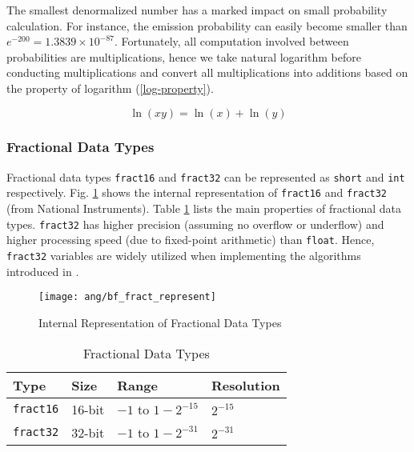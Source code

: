 The smallest denormalized number has a marked impact on small probability calculation. For instance, the emission probability can easily become smaller than $e^{-200} = 1.3839 \times 10^{-87}$. Fortunately, all computation involved between probabilities are multiplications, hence we take natural logarithm before conducting multiplications and convert all multiplications into additions based on the property of logarithm (\ref{log-property}).

\begin{equation}
\label{log-property}
\ln(xy) = \ln(x) + \ln(y)
\end{equation}


\subsubsection{Fractional Data Types}

Fractional data types \texttt{fract16} and \texttt{fract32} can be represented as \texttt{short} and \texttt{int} respectively. Fig. \ref{bf_fract_represent} shows the internal representation of \texttt{fract16} and \texttt{fract32} (from National Instruments). Table \ref{fractional-data-types} lists the main properties of fractional data types. \texttt{fract32} has higher precision (assuming no overflow or underflow) and higher processing speed (due to fixed-point arithmetic) than \texttt{float}. Hence, \texttt{fract32} variables are widely utilized when implementing the algorithms introduced in .

\begin{figure}[H]
\centering
\texttt{[image: ang/bf\_fract\_represent]}
\caption{Internal Representation of Fractional Data Types}
\label{bf_fract_represent}
\end{figure}

\begin{table}[H]
\centering
\caption{Fractional Data Types}
\label{fractional-data-types}
\begin{tabu} to \textwidth {XXXX}
\toprule
Type &Size &Range &Resolution\\
\hline
\texttt{fract16} &16-bit &$-1$ to $1 - 2^{-15}$ &$2^{-15}$\\
\hline
\texttt{fract32} &32-bit &$-1$ to $1 - 2^{-31}$ &$2^{-31}$\\
\bottomrule
\end{tabu}
\end{table}

